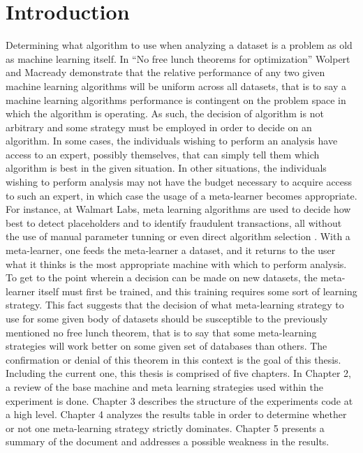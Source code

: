 \chapter{Introduction}
\label{Introduction}
Determining what algorithm to use when analyzing a dataset is a problem as
old as machine learning itself. In ``No free lunch theorems for optimization''
Wolpert and Macready demonstrate that the relative performance of any two given
machine learning algorithms will be uniform across all datasets, that is to say
a machine learning algorithms performance is contingent on the problem space in
which the algorithm is operating. As such, the decision of algorithm is not
arbitrary and some strategy must be employed in order to decide
on an algorithm. In some cases, the individuals wishing to perform an analysis
have access to an expert, possibly themselves, that can simply tell them which
algorithm is best in the given situation. In other situations, the individuals
wishing to perform analysis may not have the budget necessary to acquire access
to such an expert, in which case the usage of a meta-learner becomes appropriate.
For instance, at Walmart Labs, meta learning algorithms are used to decide how
best to detect placeholders and to identify fraudulent transactions, all without
the use of manual parameter tunning or even direct algorithm selection \cite{Gupta}.
With a meta-learner, one feeds the meta-learner a dataset, and it returns to the
user what it thinks is the most appropriate machine with which to perform
analysis. To get to the point wherein a decision can be made on new datasets, the
meta-learner itself must first be trained, and this training requires some
sort of learning strategy. This fact suggests that the decision of what
meta-learning strategy to use for some given body of datasets should be
susceptible to the previously mentioned no free lunch theorem, that is to say
that some meta-learning strategies will work better on some given set of
databases than others. The confirmation or denial of this theorem in this
context is the goal of this thesis. Including the current one, this thesis is
comprised of five chapters. In Chapter 2, a review of the base machine and meta
learning strategies used within the experiment is done. Chapter 3 describes the
structure of the experiments code at a high level. Chapter 4 analyzes the
results table in order to determine whether or not one meta-learning strategy
strictly dominates. Chapter 5 presents a summary of the document and addresses a
possible weakness in the results.

\pagebreak
